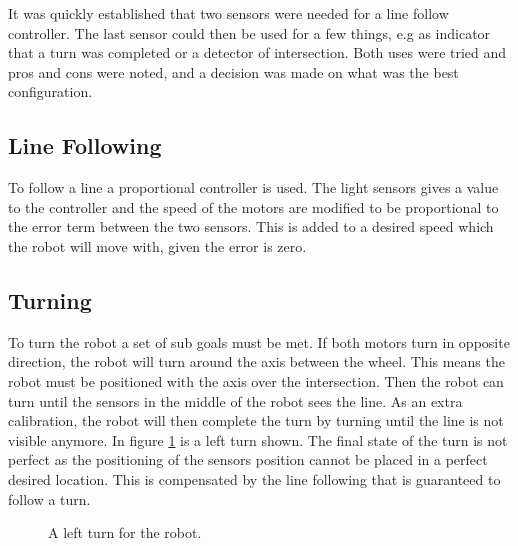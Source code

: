 It was quickly established that two sensors were needed for a line follow controller. The last sensor could then be used for a few things, e.g as indicator that a turn was completed or a detector of intersection. Both uses were tried and pros and cons were noted, and a decision was made on what was the best configuration. 

\subsection{Line Following}
To follow a line a proportional controller is used.
The light sensors gives a value to the controller and the speed of the motors are modified to be proportional to the error term between the two sensors.
This is added to a desired speed which the robot will move with, given the error is zero.

\begin{figure}
\end{figure}


\subsection{Turning}
To turn the robot a set of sub goals must be met.
If both motors turn in opposite direction, the robot will turn around the axis between the wheel.
This means the robot must be positioned with the axis over the intersection.
Then the robot can turn until the sensors in the middle of the robot sees the line.
As an extra calibration, the robot will then complete the turn by turning until the line is not visible anymore.
In figure \ref{fig:left_turn} is a left turn shown.
The final state of the turn is not perfect as the positioning of the sensors position cannot be placed in a perfect desired location.
This is compensated by the line following that is guaranteed to follow a turn.

\begin{figure}

 \caption{A left turn for the robot.}
 \label{fig:left_turn}
\end{figure}


